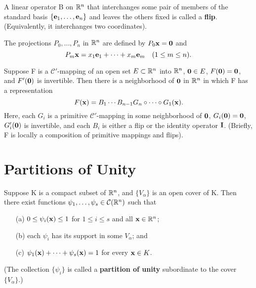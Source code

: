\begin{definition}[Flip]
  \label{def:chap10:flip}
  A linear operator B on $\mathbb{R}^n$ that interchanges some pair of
  members of the standard basis $\{ \mathbf{e}_1, \dots, \mathbf{e}_n \}$
  and leaves the others fixed is called a \textbf{flip}.
  (Equivalently, it interchanges two coordinates).
\end{definition}

\begin{definition}
  \label{def:chap10:standard_projections}
  The projections $P_0, \dots, P_n$ in $\mathbb{R}^n$ are defined by $P_0
  \mathbf{x} = \mathbf{0}$ and
  \[
    P_m \mathbf{x} = x_1 \mathbf{e}_1 + \dots + x_m \mathbf{e}_m \quad (1
    \le m \le n).
  \]
\end{definition}

\begin{theorem}
  \label{thm:chap10:local_primitive_representation}
  Suppose F is a $\mathcal{C}'$-mapping of an open set $E \subset
  \mathbb{R}^n$ into $\mathbb{R}^n$, $\mathbf{0} \in E$, $F(\mathbf{0}) = \mathbf{0}$, and
  $F'(\mathbf{0})$ is invertible.
  Then there is a neighborhood of $\mathbf{0}$ in $\mathbb{R}^n$ in which F has
  a representation
  \[
    F(\mathbf{x}) = B_1 \cdots B_{n-1} G_n \circ \dots \circ G_1 (\mathbf{x}).
  \]
  Here, each $G_i$ is a primitive $\mathcal{C}'$-mapping in some
  neighborhood of $\mathbf{0}$, $G_i(\mathbf{0})=\mathbf{0}$,
  $G_i'(\mathbf{0})$ is invertible, and each $B_i$ is either a flip or
  the identity operator $\mathbf{I}$.
  (Briefly, F is locally a composition of primitive mappings and flips).
\end{theorem}

\section{Partitions of Unity}

\begin{theorem}
  \label{thm:chap10:partition_of_unity}
  Suppose K is a compact subset of $\mathbb{R}^n$, and $\{ V_\alpha \}$ is an
  open cover of K. Then there exist functions $\psi_1, \dots, \psi_s
  \in \mathcal{C}(\mathbb{R}^n)$ such that
  \begin{enumerate}
    \item[(a)] $0 \le \psi_i(\mathbf{x}) \le 1$ for $1 \le i \le s$ and
      all $\mathbf{x} \in \mathbb{R}^n$;
    \item[(b)] each $\psi_i$ has its support in some $V_\alpha$; and
    \item[(c)] $\psi_1(\mathbf{x}) + \dots + \psi_s(\mathbf{x}) = 1$ for
      every $\mathbf{x} \in K$.
  \end{enumerate}
  (The collection $\{ \psi_i \}$ is called a \textbf{partition of
  unity} subordinate to the cover $\{ V_\alpha \}$.)
\end{theorem}

